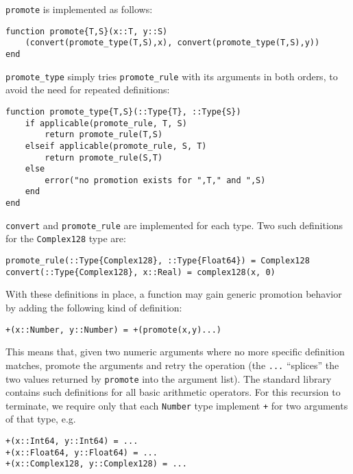 {\tt promote} is implemented as follows:

\vspace{-0.2in}
\begin{singlespace}
\begin{verbatim}
function promote{T,S}(x::T, y::S)
    (convert(promote_type(T,S),x), convert(promote_type(T,S),y))
end
\end{verbatim}
\end{singlespace}

{\tt promote\_type} simply tries {\tt promote\_rule} with its arguments in
both orders, to avoid the need for repeated definitions:

\vspace{-0.2in}
\begin{singlespace}
\begin{verbatim}
function promote_type{T,S}(::Type{T}, ::Type{S})
    if applicable(promote_rule, T, S)
        return promote_rule(T,S)
    elseif applicable(promote_rule, S, T)
        return promote_rule(S,T)
    else
        error("no promotion exists for ",T," and ",S)
    end
end
\end{verbatim}
\end{singlespace}

{\tt convert} and {\tt promote\_rule} are implemented for each type. Two
such definitions for the {\tt Complex128} type are:

\begin{verbatim}
promote_rule(::Type{Complex128}, ::Type{Float64}) = Complex128
convert(::Type{Complex128}, x::Real) = complex128(x, 0)
\end{verbatim}

With these definitions in place, a function may gain generic promotion
behavior by adding the following kind of definition:

\begin{verbatim}
+(x::Number, y::Number) = +(promote(x,y)...)
\end{verbatim}

This means that, given two numeric arguments where no more specific
definition matches, promote the arguments and retry the operation
(the {\tt ...} ``splices'' the two values returned by {\tt promote} into
the argument list).
The standard library contains such definitions for all basic arithmetic
operators.
For this recursion to terminate, we require only that each {\tt Number}
type implement {\tt +} for two arguments of that type, e.g.

\begin{verbatim}
+(x::Int64, y::Int64) = ...
+(x::Float64, y::Float64) = ...
+(x::Complex128, y::Complex128) = ...
\end{verbatim}

